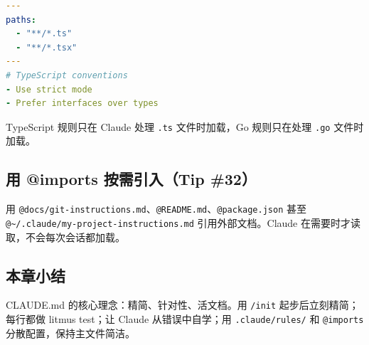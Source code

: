 \begin{lstlisting}[caption={条件加载规则示例}, language=yaml]
---
paths:
  - "**/*.ts"
  - "**/*.tsx"
---
# TypeScript conventions
- Use strict mode
- Prefer interfaces over types
\end{lstlisting}

TypeScript 规则只在 Claude 处理 \texttt{.ts} 文件时加载，Go 规则只在处理 \texttt{.go} 文件时加载。

\subsection{用 @imports 按需引入（Tip \#32）}

用 \texttt{@docs/git-instructions.md}、\texttt{@README.md}、\texttt{@package.json} 甚至 \texttt{@\textasciitilde/.claude/my-project-instructions.md} 引用外部文档。Claude 在需要时才读取，不会每次会话都加载。

\subsection{本章小结}

CLAUDE.md 的核心理念：精简、针对性、活文档。用 \texttt{/init} 起步后立刻精简；每行都做 litmus test；让 Claude 从错误中自学；用 \texttt{.claude/rules/} 和 \texttt{@imports} 分散配置，保持主文件简洁。

